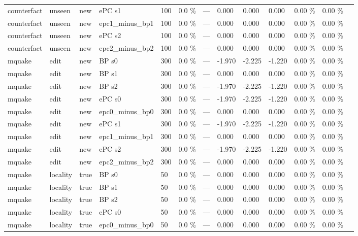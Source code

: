 \documentclass[10pt,a4paper]{article}
\begin{document}
\begin{center}
\begin{tabularx}{\textwidth}{@{}p{}XXXXXXXXXXXX@{}}
counterfact & unseen & new & ePC s1 & 100 & 0.0 \% & — & 0.000 & 0.000 & 0.000 & 0.00 \% & 0.00 \% &  \\
counterfact & unseen & new & epc1\_minus\_bp1 & 100 & 0.0 \% & — & 0.000 & 0.000 & 0.000 & 0.00 \% & 0.00 \% &  \\
counterfact & unseen & new & ePC s2 & 100 & 0.0 \% & — & 0.000 & 0.000 & 0.000 & 0.00 \% & 0.00 \% &  \\
counterfact & unseen & new & epc2\_minus\_bp2 & 100 & 0.0 \% & — & 0.000 & 0.000 & 0.000 & 0.00 \% & 0.00 \% &  \\
mquake & edit & new & BP s0 & 300 & 0.0 \% & — & -1.970 & -2.225 & -1.220 & 0.00 \% & 0.00 \% &  \\
mquake & edit & new & BP s1 & 300 & 0.0 \% & — & 0.000 & 0.000 & 0.000 & 0.00 \% & 0.00 \% &  \\
mquake & edit & new & BP s2 & 300 & 0.0 \% & — & -1.970 & -2.225 & -1.220 & 0.00 \% & 0.00 \% &  \\
mquake & edit & new & ePC s0 & 300 & 0.0 \% & — & -1.970 & -2.225 & -1.220 & 0.00 \% & 0.00 \% &  \\
mquake & edit & new & epc0\_minus\_bp0 & 300 & 0.0 \% & — & 0.000 & 0.000 & 0.000 & 0.00 \% & 0.00 \% &  \\
mquake & edit & new & ePC s1 & 300 & 0.0 \% & — & -1.970 & -2.225 & -1.220 & 0.00 \% & 0.00 \% &  \\
mquake & edit & new & epc1\_minus\_bp1 & 300 & 0.0 \% & — & 0.000 & 0.000 & 0.000 & 0.00 \% & 0.00 \% &  \\
mquake & edit & new & ePC s2 & 300 & 0.0 \% & — & -1.970 & -2.225 & -1.220 & 0.00 \% & 0.00 \% &  \\
mquake & edit & new & epc2\_minus\_bp2 & 300 & 0.0 \% & — & 0.000 & 0.000 & 0.000 & 0.00 \% & 0.00 \% &  \\
mquake & locality & true & BP s0 & 50 & 0.0 \% & — & 0.000 & 0.000 & 0.000 & 0.00 \% & 0.00 \% &  \\
mquake & locality & true & BP s1 & 50 & 0.0 \% & — & 0.000 & 0.000 & 0.000 & 0.00 \% & 0.00 \% &  \\
mquake & locality & true & BP s2 & 50 & 0.0 \% & — & 0.000 & 0.000 & 0.000 & 0.00 \% & 0.00 \% &  \\
mquake & locality & true & ePC s0 & 50 & 0.0 \% & — & 0.000 & 0.000 & 0.000 & 0.00 \% & 0.00 \% &  \\
mquake & locality & true & epc0\_minus\_bp0 & 50 & 0.0 \% & — & 0.000 & 0.000 & 0.000 & 0.00 \% & 0.00 \% &  \\

\end{tabularx}
\end{center}
\end{document}
